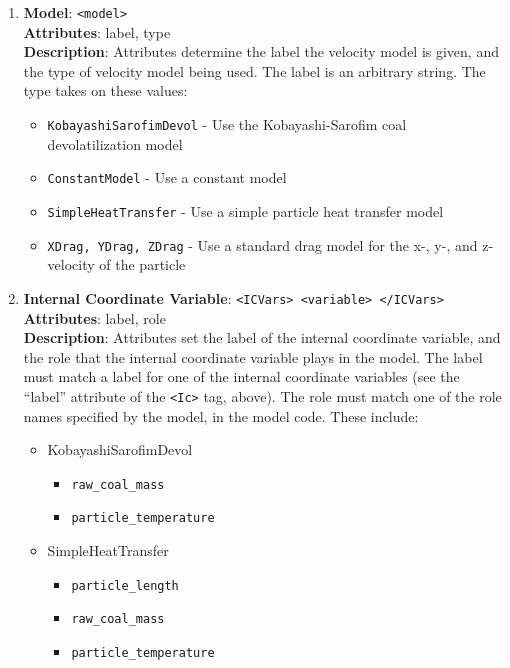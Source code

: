 \begin{enumerate}

\item {\bf Model}: \verb=<model>= \\
{\bf Attributes}: label, type \\
{\bf Description}: Attributes determine the label the velocity model is given, and the type of velocity model being used.  The label is an arbitrary string.  The type takes on these values:
\begin{itemize}
\item \verb=KobayashiSarofimDevol= - Use the Kobayashi-Sarofim coal devolatilization model
\item \verb=ConstantModel= - Use a constant model
\item \verb=SimpleHeatTransfer= - Use a simple particle heat transfer model
\item \verb=XDrag, YDrag, ZDrag= - Use a standard drag model for the x-, y-, and z-velocity of the particle
\end{itemize}

\item {\bf Internal Coordinate Variable}: \verb=<ICVars> <variable> </ICVars>= \\
{\bf Attributes}: label, role \\
{\bf Description}: Attributes set the label of the internal coordinate variable, and the role that the internal coordinate variable plays in the model.  The label must match a label for one of the internal coordinate variables (see the ``label'' attribute of the \verb=<Ic>= tag, above).  The role must match one of the role names specified by the model, in the model code.  These include:
\begin{itemize}

\item KobayashiSarofimDevol
	\begin{itemize}
	\item \verb=raw_coal_mass=
	\item \verb=particle_temperature=
	\end{itemize}

\item SimpleHeatTransfer
	\begin{itemize}
	\item \verb=particle_length=
	\item \verb=raw_coal_mass=
	\item \verb=particle_temperature=
	\end{itemize}


\end{itemize}
\end{enumerate}
